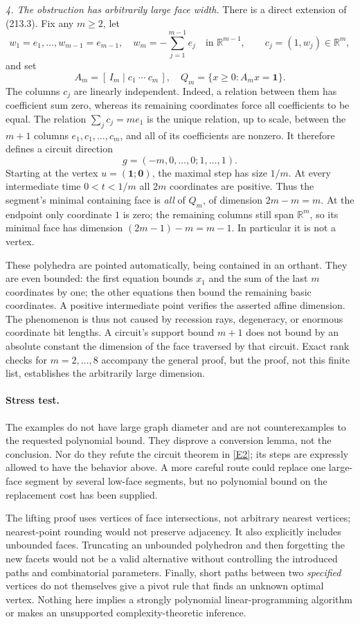 \documentclass[11pt,a4paper]{article}
\newcommand{\R}{\mathbb{R}}
\newcommand{\eref}[2]{\hyperlink{extra:#1:#2}{[E#2]}}
\begin{document}
\textit{4. The obstruction has arbitrarily large face width.}
There is a direct extension of (213.3). Fix any $m\ge2$, let
\[
 w_1=e_1,\ldots,w_{m-1}=e_{m-1},\quad
 w_m=-\sum_{j=1}^{m-1}e_j\quad\text{in }\R^{m-1},
 \qquad c_j=(1,w_j)\in\R^m,
\]
and set
\[
 A_m=[\,I_m\mid c_1\ \cdots\ c_m\,],\quad
 Q_m=\{x\ge0:A_mx=\mathbf1\}.
\]
The columns $c_j$ are linearly independent. Indeed, a relation between them
has coefficient sum zero, whereas its remaining coordinates force all
coefficients to be equal. The relation
$\sum_jc_j=m e_1$ is the unique relation, up to scale, between the $m+1$
columns $e_1,c_1,\ldots,c_m$, and all of its coefficients are nonzero.
It therefore defines a circuit direction
\[
 g=(-m,0,\ldots,0;1,\ldots,1).
\]
Starting at the vertex $u=(\mathbf1;\mathbf0)$, the maximal step has size
$1/m$. At every intermediate time $0<t<1/m$ all $2m$ coordinates are
positive. Thus the segment's minimal containing face is \emph{all} of
$Q_m$, of dimension $2m-m=m$. At the endpoint only coordinate $1$ is zero;
the remaining columns still span $\R^m$, so its minimal face has dimension
$(2m-1)-m=m-1$. In particular it is not a vertex.

These polyhedra are pointed automatically, being contained in an orthant.
They are even bounded: the first equation bounds $x_1$ and the sum of the
last $m$ coordinates by one; the other equations then bound the remaining
basic coordinates. A positive intermediate point verifies the asserted
affine dimension. The phenomenon is thus not caused by recession rays,
degeneracy, or enormous coordinate bit lengths. A circuit's support bound
$m+1$ does not bound by an absolute constant the dimension of the face
traversed by that circuit. Exact rank checks for $m=2,\ldots,8$ accompany
the general proof, but the proof, not this finite list, establishes the
arbitrarily large dimension.

\paragraph{Stress test.}
The examples do not have large graph diameter and are not counterexamples
to the requested polynomial bound. They disprove a conversion lemma, not
the conclusion. Nor do they refute the circuit theorem in \eref{213}{2};
its steps are expressly allowed to have the behavior above. A more careful
route could replace one large-face segment by several low-face segments,
but no polynomial bound on the replacement cost has been supplied.

The lifting proof uses vertices of face intersections, not arbitrary nearest
vertices; nearest-point rounding would not preserve adjacency. It also
explicitly includes unbounded faces. Truncating an unbounded polyhedron and
then forgetting the new facets would not be a valid alternative without
controlling the introduced paths and combinatorial parameters. Finally,
short paths between two \emph{specified} vertices do not themselves give a
pivot rule that finds an unknown optimal vertex. Nothing here implies a
strongly polynomial linear-programming algorithm or makes an unsupported
complexity-theoretic inference.
\end{document}
